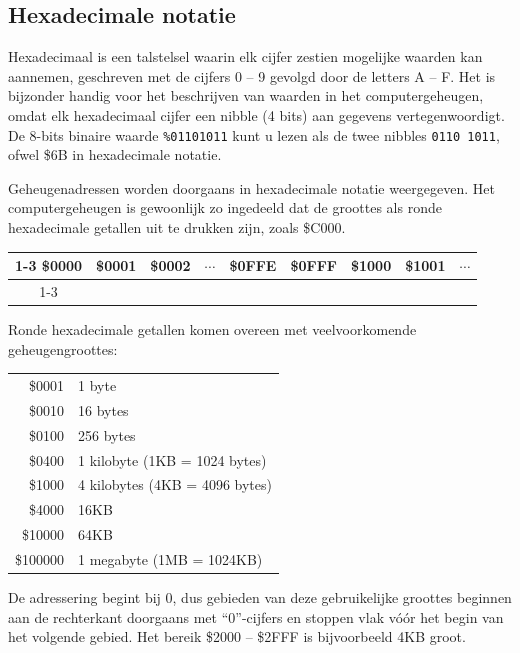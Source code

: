 \subsection{Hexadecimale notatie}

Hexadecimaal is een talstelsel waarin elk cijfer zestien mogelijke waarden kan aannemen, geschreven met de cijfers 0 -- 9 gevolgd door de letters A -- F. Het is bijzonder handig voor het beschrijven van waarden in het computergeheugen, omdat elk hexadecimaal cijfer een nibble (4 bits) aan gegevens vertegenwoordigt. De 8-bits binaire waarde \texttt{\%01101011} kunt u lezen als de twee nibbles \texttt{0110 1011}, ofwel \$6B in hexadecimale notatie.

Geheugenadressen worden doorgaans in hexadecimale notatie weergegeven. Het computergeheugen is gewoonlijk zo ingedeeld dat de groottes als ronde hexadecimale getallen uit te drukken zijn, zoals \$C000.

\begin{center}
\begin{tabular}{|c|c|c|c|c|c|c|c|c}
\cline{1-3}\cline{5-8}
\$0000 & \$0001 & \$0002 & $\cdots$ & \$0FFE & \$0FFF & \$1000 & \$1001 & $\cdots$ \\
\cline{1-3}\cline{5-8}
\end{tabular}
\end{center}

Ronde hexadecimale getallen komen overeen met veelvoorkomende geheugengroottes:

\begin{center}
\begin{tabular}{rl}
\$0001 & 1 byte \\\$0010 & 16 bytes \\\$0100 & 256 bytes \\\$0400 & 1 kilobyte (1KB = 1024 bytes) \\\$1000 & 4 kilobytes (4KB = 4096 bytes) \\\$4000 & 16KB \\\$10000 & 64KB \\\$100000 & 1 megabyte (1MB = 1024KB) \\
\end{tabular}
\end{center}

De adressering begint bij 0, dus gebieden van deze gebruikelijke groottes beginnen aan de rechterkant doorgaans met ``0''-cijfers en stoppen vlak vóór het begin van het volgende gebied. Het bereik \$2000 -- \$2FFF is bijvoorbeeld 4KB groot.

